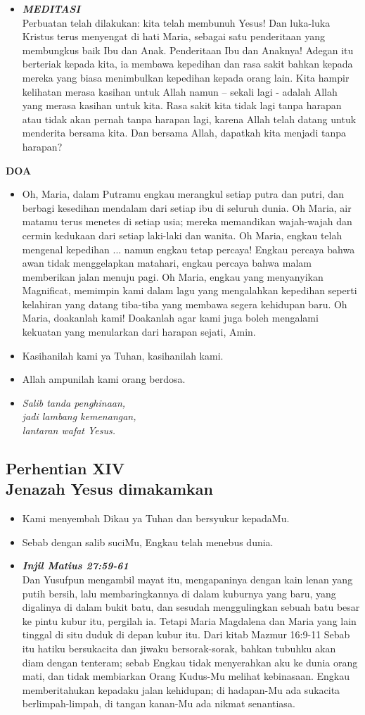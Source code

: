 \documentclass[a5paper,titlepage,11pt,openany]{scrbook}
\newcommand{\BU}[1]{\begin{itemize} \item[U:] #1 \end{itemize}}
\newcommand{\BP}[1]{\begin{itemize} \item[P:] #1 \end{itemize}}
\newcommand{\kamiMenyembah}{\BP{ Kami menyembah Dikau ya Tuhan dan bersyukur kepadaMu.}
\BU{Sebab dengan salib suciMu, Engkau telah menebus dunia.}
}
\newcommand{\kasihanilahKami}{\BP{Kasihanilah kami ya Tuhan, kasihanilah kami.}
\BU{Allah ampunilah kami orang berdosa.}}
\newcommand{\BPi}[2]
{\begin{itemize} \item[P1:] \textbf{\emph{#1}}\\#2 \end{itemize}}
\newcommand{\BPii}[1]
{\begin{itemize} \item[P2:] \textbf{\emph{MEDITASI}}\\#1 \end{itemize}}
\newcommand{\lagu}[2]{%
\begin{itemize}
\item[#1.] \it{#2}
\end{itemize}}
\newcommand{\henti}[2]{%
\subsection*{Perhentian #1\\#2 } 
\kamiMenyembah
}
\begin{document}
\BPii{Perbuatan telah dilakukan: kita telah membunuh Yesus!  Dan luka-luka Kristus terus menyengat di hati Maria, sebagai satu penderitaan yang membungkus baik Ibu dan Anak. Penderitaan Ibu dan Anaknya! Adegan itu berteriak kepada kita, ia membawa kepedihan dan rasa sakit bahkan kepada mereka yang biasa menimbulkan kepedihan kepada orang lain. Kita hampir kelihatan merasa kasihan untuk Allah namun -- sekali lagi - adalah Allah yang merasa kasihan untuk kita. Rasa sakit kita tidak lagi tanpa harapan atau tidak akan pernah tanpa harapan lagi, karena Allah telah datang untuk menderita bersama kita. Dan bersama Allah, dapatkah kita menjadi tanpa harapan? }

\textbf{	DOA}

\BU{Oh, Maria, dalam Putramu engkau merangkul setiap putra dan putri, dan berbagi kesedihan mendalam dari setiap ibu di seluruh dunia. Oh Maria, air matamu terus menetes di setiap usia; mereka memandikan wajah-wajah dan cermin kedukaan dari setiap laki-laki dan wanita. Oh Maria, engkau telah mengenal kepedihan ... namun engkau tetap percaya! Engkau percaya bahwa awan tidak menggelapkan matahari, engkau percaya bahwa malam memberikan jalan menuju pagi. Oh Maria, engkau yang menyanyikan Magnificat, memimpin kami dalam lagu yang mengalahkan kepedihan seperti kelahiran yang datang tiba-tiba yang membawa segera kehidupan baru. Oh Maria, doakanlah kami! Doakanlah agar kami juga boleh mengalami \\kekuatan yang menularkan dari harapan sejati, Amin. }

\kasihanilahKami

\lagu{14}{Salib tanda penghinaan,\\
jadi lambang kemenangan,\\
lantaran wafat Yesus.}

\henti{XIV}{	Jenazah Yesus dimakamkan}

\BPi{Injil Matius 27:59-61 }{
	Dan Yusufpun mengambil mayat itu, mengapaninya dengan kain lenan yang putih bersih, lalu membaringkannya di dalam kuburnya yang baru, yang digalinya di dalam bukit batu, dan sesudah menggulingkan sebuah batu besar ke pintu kubur itu, pergilah ia. Tetapi Maria Magdalena dan Maria yang lain tinggal di situ duduk di depan kubur itu. Dari kitab Mazmur 16:9-11 Sebab itu hatiku bersukacita dan jiwaku bersorak-sorak, bahkan tubuhku akan diam dengan tenteram; sebab Engkau tidak menyerahkan aku ke dunia orang mati, dan tidak membiarkan Orang Kudus-Mu melihat kebinasaan. Engkau memberitahukan kepadaku jalan kehidupan; di hadapan-Mu ada sukacita berlimpah-limpah, di tangan kanan-Mu ada nikmat senantiasa. }
\end{document}
